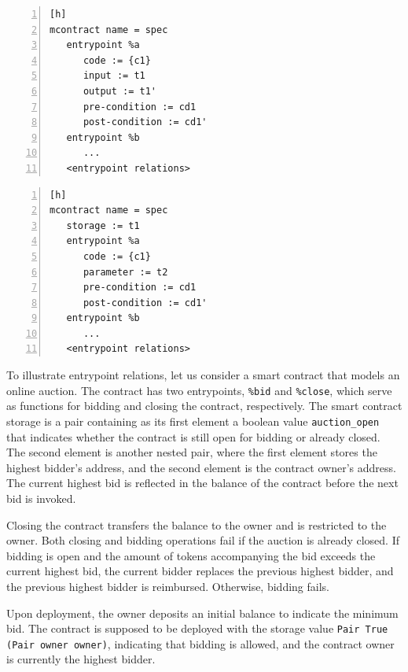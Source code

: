 \documentclass[a4paper,USenglish,cleveref, autoref,anonymous]{lipics-v2021}
\begin{document}
\begin{lstlisting}[float,captionpos=b,caption={Multiple entrypoint specification syntax (option 1)},label={lst:multiple-entrypoint-specification-1},numbers=left][h]
mcontract name = spec
   entrypoint %a 
      code := {c1}
      input := t1
      output := t1'
      pre-condition := cd1
      post-condition := cd1'
   entrypoint %b 
      ...
   <entrypoint relations>
\end{lstlisting}

\begin{lstlisting}[float,captionpos=b,caption={Multiple entrypoint specification syntax (option 2)},label={lst:multiple-entrypoint-specification-2},numbers=left][h]
mcontract name = spec
   storage := t1
   entrypoint %a 
      code := {c1}
      parameter := t2
      pre-condition := cd1
      post-condition := cd1'
   entrypoint %b 
      ...
   <entrypoint relations>
\end{lstlisting}

To illustrate entrypoint relations, let us consider a smart contract
that models an online auction. The contract has two entrypoints,
\lstinline|%bid| and \lstinline|%close|, which serve as functions for
bidding and closing the contract, respectively.  The smart contract
storage is a pair containing as its first element a boolean value
\lstinline|auction_open| that indicates whether the contract is still
open for bidding or already closed. The second element is another
nested pair, where the first element stores the highest bidder's
address, and the second element is the contract owner's address. The
current highest bid is reflected in the balance of the contract before
the next bid is invoked. 

Closing the contract transfers the balance to the owner and is
restricted to the owner. Both closing and bidding operations fail if
the auction is already closed. If bidding is open and the amount of
tokens accompanying the bid exceeds the current highest bid, the
current bidder replaces the previous highest bidder, and the previous
highest bidder is reimbursed. Otherwise, bidding fails. 

Upon deployment, the owner deposits an initial balance to indicate the minimum bid. The contract is supposed to be deployed with the storage value  \lstinline/Pair True (Pair owner owner)/, indicating that bidding is allowed, and the contract owner is currently the highest bidder.
\end{document}

